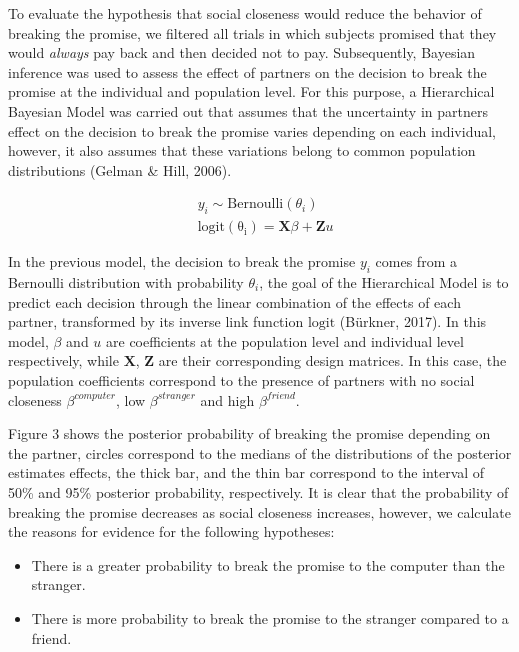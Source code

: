 \documentclass[12pt,]{article}
\begin{document}
To evaluate the hypothesis that social closeness would reduce the
behavior of breaking the promise, we filtered all trials in which
subjects promised that they would \emph{always} pay back and then
decided not to pay. Subsequently, Bayesian inference was used to assess
the effect of partners on the decision to break the promise at the
individual and population level. For this purpose, a Hierarchical
Bayesian Model was carried out that assumes that the uncertainty in
partners effect on the decision to break the promise varies depending on
each individual, however, it also assumes that these variations belong
to common population distributions (Gelman \& Hill, 2006).

\[
\begin{aligned}
&y_i \sim \mathrm{Bernoulli}(\theta_i) \\
&\mathrm{logit(\theta_i)} = \mathbf{X}\beta  +  \mathbf{Z}u
\end{aligned}
\]

In the previous model, the decision to break the promise \(y_i\) comes
from a Bernoulli distribution with probability \(\theta_i\), the goal of
the Hierarchical Model is to predict each decision through the linear
combination of the effects of each partner, transformed by its inverse
link function \(\mathrm{logit}\) (Bürkner, 2017). In this model,
\(\beta\) and \(u\) are coefficients at the population level and
individual level respectively, while \(\mathbf{X}\), \(\mathbf{Z}\) are
their corresponding design matrices. In this case, the population
coefficients correspond to the presence of partners with no social
closeness \(\beta^{computer}\), low \(\beta^{stranger}\) and high
\(\beta^{friend}\).

Figure 3 shows the posterior probability of breaking the promise
depending on the partner, circles correspond to the medians of the
distributions of the posterior estimates effects, the thick bar, and the
thin bar correspond to the interval of 50\% and 95\% posterior
probability, respectively. It is clear that the probability of breaking
the promise decreases as social closeness increases, however, we
calculate the reasons for evidence for the following hypotheses:

\begin{itemize}
\item
  There is a greater probability to break the promise to the computer
  than the stranger.
\item
  There is more probability to break the promise to the stranger
  compared to a friend.
\end{itemize}
\end{document}
